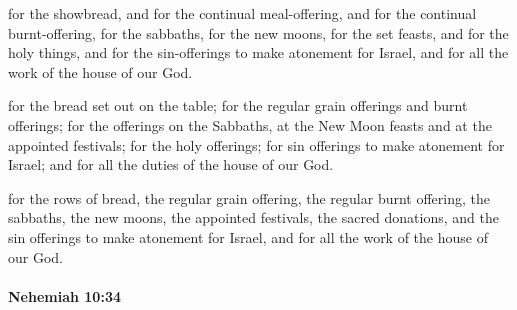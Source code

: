 			\begin{versebox}
					\item[BHS] 
					\item[LXX] 
					\item[ASV] for the showbread, and for the continual meal-offering, and for the continual burnt-offering, for the sabbaths, for the new moons, for the set feasts, and for the holy things, and for the sin-offerings to make atonement for Israel, and for all the work of the house of our God.
					\item[NIV] for the bread set out on the table; for the regular grain offerings and burnt offerings; for the offerings on the Sabbaths, at the New Moon feasts and at the appointed festivals; for the holy offerings; for sin offerings to make atonement for Israel; and for all the duties of the house of our God.
					\item[NRSV] for the rows of bread, the regular grain offering, the regular burnt offering, the sabbaths, the new moons, the appointed festivals, the sacred donations, and the sin offerings to make atonement for Israel, and for all the work of the house of our God.
			\end{versebox}

		\paragraph{Nehemiah 10:34} %
			\label{NEHEMIAH-10-34}

